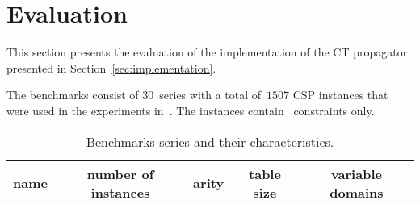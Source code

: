 \documentclass[a4paper,11pt]{article}
\newcommand{\Secref}[1]{Section~\ref{#1}}
\newcommand{\Chapref}[1]{Section~\ref{#1}}
\newcommand{\Table}{\Constraint{Table}}
\newcommand{\Supports}{\texttt{supports}}
\newcommand{\Residues}{\texttt{residues}}
\newcommand{\CTpaper}[0]{DBLP:conf/cp/DemeulenaereHLP16}
\numberwithin{equation}{section}
\begin{document}










\section{Evaluation}
\label{evaluation}

This section presents the evaluation of the implementation of the CT propagator
presented in \Chapref{sec:implementation}. 

\label{evaluation:setup}

The benchmarks consist of $30$~series 
with a total of~$1507$ CSP instances that were used in the
experiments in~\cite{\CTpaper}. The instances contain \Table~constraints
only.


  \begin{table}[h]%
    \caption{Benchmarks series and their characteristics.}
    \label{tab:benchmarks}
    
    \begin{sideways}
      \centering
      \begin{tabular}{lcccc}  %
        name & number of instances & arity & table size & variable domains \\
        \midrule
         
      \end{tabular}
    \end{sideways}
    \end{table}
\end{document}
